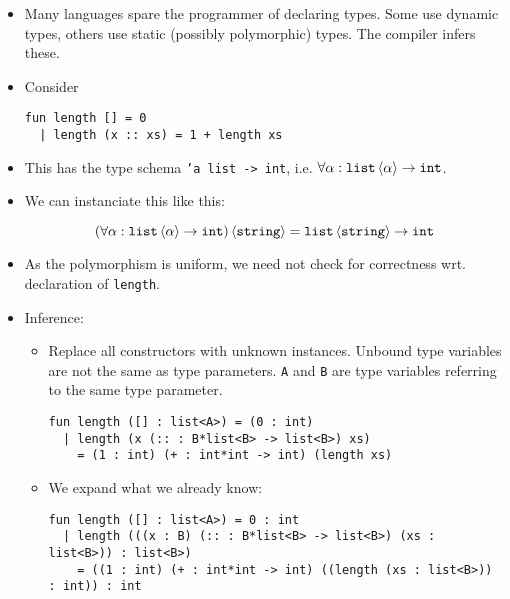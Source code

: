 \begin{itemize}

\item Many languages spare the programmer of declaring types. Some use dynamic
types, others use static (possibly polymorphic) types. The compiler infers
these.

\item Consider

\begin{verbatim}
fun length [] = 0
  | length (x :: xs) = 1 + length xs
\end{verbatim} 

\item This has the type schema \texttt{'a list -> int}, i.e. $\forall\alpha:
\mathtt{list}\left\langle{\alpha}\right\rangle \rightarrow \mathtt{int}$.

\item We can instanciate this like this:

$$\left({\forall\alpha: \mathtt{list}\left\langle{\alpha}\right\rangle \rightarrow
\mathtt{int}}\right)\left\langle{\mathtt{string}}\right\rangle = \mathtt{list}\left\langle{\mathtt{string}}\right\rangle
\rightarrow \mathtt{int}$$

\item As the polymorphism is uniform, we need not check for correctness wrt.
declaration of \texttt{length}.

\item Inference:

\begin{itemize}

\item Replace all constructors with unknown instances. Unbound type variables
are not the same as type parameters. \texttt{A} and \texttt{B} are type
variables referring to the same type parameter.

\begin{verbatim}
fun length ([] : list<A>) = (0 : int)
  | length (x (:: : B*list<B> -> list<B>) xs)
    = (1 : int) (+ : int*int -> int) (length xs)
\end{verbatim}

\item We expand what we already know:

\begin{verbatim}
fun length ([] : list<A>) = 0 : int
  | length (((x : B) (:: : B*list<B> -> list<B>) (xs : list<B>)) : list<B>)
    = ((1 : int) (+ : int*int -> int) ((length (xs : list<B>)) : int)) : int
\end{verbatim}

\end{itemize}


\end{itemize}
